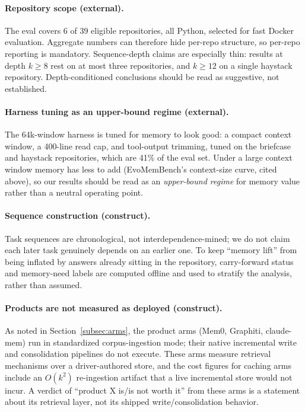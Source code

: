 \documentclass[11pt]{article}
\begin{document}
\paragraph{Repository scope (external).} The eval covers 6 of 39 eligible repositories, all Python, selected for fast Docker evaluation. Aggregate numbers can therefore hide per-repo structure, so per-repo reporting is mandatory. Sequence-depth claims are especially thin: results at depth $k{\geq}8$ rest on at most three repositories, and $k{\geq}12$ on a single haystack repository. Depth-conditioned conclusions should be read as suggestive, not established.

\paragraph{Harness tuning as an upper-bound regime (external).} The 64k-window harness is tuned for memory to look good: a compact context window, a 400-line read cap, and tool-output trimming, tuned on the briefcase and haystack repositories, which are 41\% of the eval set. Under a large context window memory has less to add (EvoMemBench's context-size curve, cited above), so our results should be read as an \emph{upper-bound regime} for memory value rather than a neutral operating point.

\paragraph{Sequence construction (construct).} Task sequences are chronological, not interdependence-mined; we do not claim each later task genuinely depends on an earlier one. To keep ``memory lift'' from being inflated by answers already sitting in the repository, carry-forward status and memory-need labels are computed offline and used to stratify the analysis, rather than assumed.

\paragraph{Products are not measured as deployed (construct).} As noted in Section~\ref{subsec:arms}, the product arms (Mem0, Graphiti, claude-mem) run in standardized corpus-ingestion mode; their native incremental write and consolidation pipelines do not execute. These arms measure retrieval mechanisms over a driver-authored store, and the cost figures for caching arms include an $O(k^2)$ re-ingestion artifact that a live incremental store would not incur. A verdict of ``product X is/is not worth it'' from these arms is a statement about its retrieval layer, not its shipped write/consolidation behavior.
\end{document}
